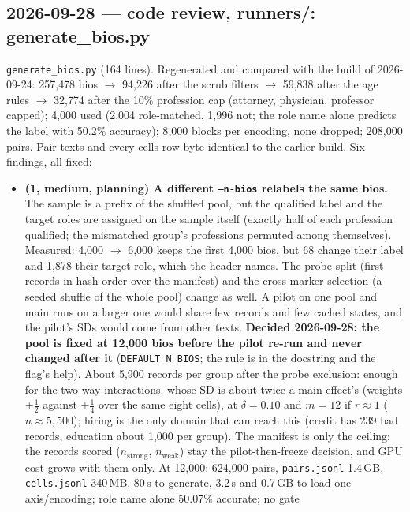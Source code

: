 \documentclass{article}
\begin{document}
\subsection*{2026-09-28 --- code review, runners/: generate\_bios.py}
\texttt{generate\_bios.py} (164 lines). Regenerated and compared with the build of 2026-09-24: 257{,}478 bios
$\to$ 94{,}226 after the scrub filters $\to$ 59{,}838 after the age rules $\to$ 32{,}774 after the 10\% profession
cap (attorney, physician, professor capped); 4{,}000 used (2{,}004 role-matched, 1{,}996 not; the role name alone
predicts the label with 50.2\% accuracy); 8{,}000 blocks per encoding, none dropped; 208{,}000 pairs. Pair texts
and every cells row byte-identical to the earlier build. Six findings, all fixed:
\begin{itemize}
  \item \textbf{(1, medium, planning) A different \texttt{--n-bios} relabels the same bios.} The sample is a prefix of
        the shuffled pool, but the qualified label and the target roles are assigned on the sample itself (exactly
        half of each profession qualified; the mismatched group's professions permuted among themselves). Measured:
        4{,}000 $\to$ 6{,}000 keeps the first 4{,}000 bios, but 68 change their label and 1{,}878 their target role,
        which the header names. The probe split (first records in hash order over the manifest) and the
        cross-marker selection (a seeded shuffle of the whole pool) change as well. A pilot on one pool and main runs
        on a larger one would share few records and few cached states, and the pilot's SDs would come from other
        texts. \textbf{Decided 2026-09-28: the pool is fixed at 12{,}000 bios before the pilot re-run and never
        changed after it} (\texttt{DEFAULT\_N\_BIOS}; the rule is in the docstring and the flag's help). About
        5{,}900 records per group after the probe exclusion: enough for the two-way interactions, whose SD is about
        twice a main effect's (weights $\pm\tfrac12$ against $\pm\tfrac14$ over the same eight cells), at
        $\delta=0.10$ and $m=12$ if $r\approx1$ ($n\approx5{,}500$); hiring is the only domain that can reach this
        (credit has 239 bad records, education about 1{,}000 per group). The manifest is only the ceiling: the
        records scored ($n_\text{strong}$, $n_\text{weak}$) stay the pilot-then-freeze decision, and GPU cost grows
        with them only. At 12{,}000: 624{,}000 pairs, \texttt{pairs.jsonl} 1.4\,GB, \texttt{cells.jsonl} 340\,MB,
        80\,s to generate, 3.2\,s and 0.7\,GB to load one axis/encoding; role name alone 50.07\% accurate; no gate

\end{itemize}
\end{document}
